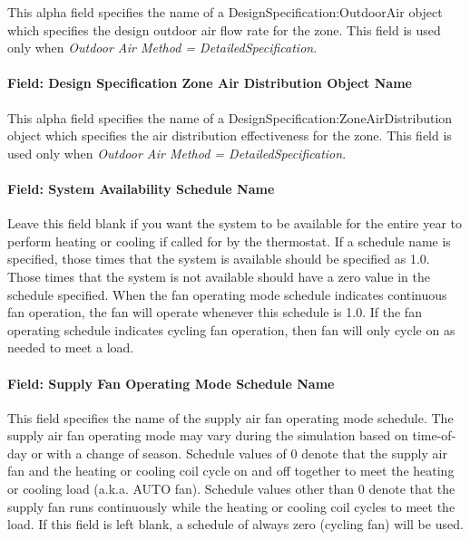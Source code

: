 This alpha field specifies the name of a DesignSpecification:OutdoorAir object which specifies the design outdoor air flow rate for the zone. This field is used only when \emph{Outdoor Air Method = DetailedSpecification}.

\paragraph{Field: Design Specification Zone Air Distribution Object Name}\label{field-design-specification-zone-air-distribution-object-name-5}

This alpha field specifies the name of a DesignSpecification:ZoneAirDistribution object which specifies the air distribution effectiveness for the zone. This field is used only when \emph{Outdoor Air Method = DetailedSpecification}.

\paragraph{Field: System Availability Schedule Name}\label{field-system-availability-schedule-name-5}

Leave this field blank if you want the system to be available for the entire year to perform heating or cooling if called for by the thermostat. If a schedule name is specified, those times that the system is available should be specified as 1.0. Those times that the system is not available should have a zero value in the schedule specified. When the fan operating mode schedule indicates continuous fan operation, the fan will operate whenever this schedule is 1.0. If the fan operating schedule indicates cycling fan operation, then fan will only cycle on as needed to meet a load.

\paragraph{Field: Supply Fan Operating Mode Schedule Name}\label{field-supply-fan-operating-mode-schedule-name-3}

This field specifies the name of the supply air fan operating mode schedule. The supply air fan operating mode may vary during the simulation based on time-of-day or with a change of season. Schedule values of 0 denote that the supply air fan and the heating or cooling coil cycle on and off together to meet the heating or cooling load (a.k.a. AUTO fan). Schedule values other than 0 denote that the supply fan runs continuously while the heating or cooling coil cycles to meet the load. If this field is left blank, a schedule of always zero (cycling fan) will be used.

